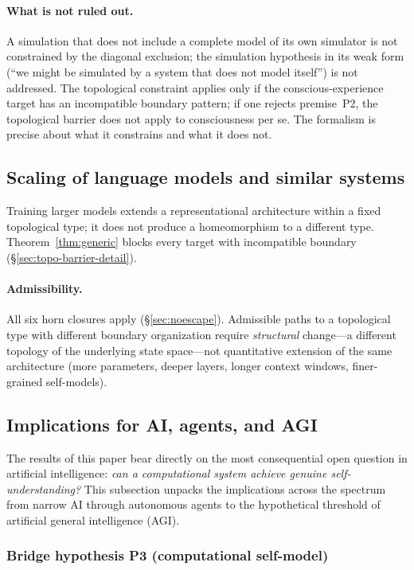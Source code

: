 \documentclass[11pt]{article}
\begin{document}
\paragraph{What is not ruled out.}
A simulation that does not include a complete model of its own
simulator is not constrained by the diagonal exclusion; the simulation
hypothesis in its weak form (``we might be simulated by a system that
does not model itself'') is not addressed.  The topological constraint
applies only if the conscious-experience target has an incompatible
boundary pattern; if one rejects premise~P2, the topological barrier
does not apply to consciousness per se.  The formalism is precise
about what it constrains and what it does not.

\subsection{Scaling of language models and similar systems}

Training larger models extends a representational architecture within a
fixed topological type; it does not produce a homeomorphism to a different
type.  Theorem~\ref{thm:generic} blocks every target with incompatible
boundary (\S\ref{sec:topo-barrier-detail}).

\paragraph{Admissibility.}
All six horn closures apply (\S\ref{sec:noescape}).  Admissible paths
to a topological type with different boundary organization require
\emph{structural} change---a different topology of the underlying state
space---not quantitative extension of the same architecture (more
parameters, deeper layers, longer context windows, finer-grained
self-models).

\subsection{Implications for AI, agents, and AGI}
\label{sec:ai-agi}

The results of this paper bear directly on the most consequential open
question in artificial intelligence: \emph{can a computational system
achieve genuine self-understanding?}  This subsection unpacks the
implications across the spectrum from narrow AI through autonomous agents
to the hypothetical threshold of artificial general intelligence (AGI).

\subsubsection{Bridge hypothesis P3 (computational self-model)}
\end{document}
